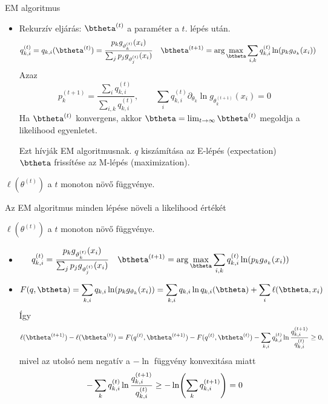 \documentclass[aspectratio=169,notheorems,9pt,\option]{beamer}
\begin{document}
\begin{frame}{EM algoritmus}
  \begin{itemize}
    \item Rekurzív eljárás: $\btheta^{(t)}$ a paraméter a $t$. lépés után.
    \begin{align*}
      q_{k,i}^{(t)}=q_{k,i}(\btheta^{(t)}) &= \frac{p_k g_{\theta^{(t)}_k}(x_i)}{\sum_j p_j g_{\theta^{(t)}_j}(x_i)} &
      \btheta^{(t+1)} &=\arg\max_{\btheta} \sum_{i,k} q_{k,i}^{(t)} \ln (p_k g_{\theta_k}(x_i))
    \end{align*}    
    Azaz
    \begin{displaymath}
       p^{(t+1)}_k = \frac{\sum_{i} q_{k,i}^{(t)}}{\sum_{i,k} q_{k,i}^{(t)}} ,
      \qquad  
      \sum_{i} q_{k,i}^{(t)} \partial_{\theta_k}\ln g_{\theta^{(t+1)}_k}(x_i)=0 
    \end{displaymath}
    Ha $\btheta^{(t)}$ konvergens, akkor $\btheta=\lim_{t\to\infty}\btheta^{(t)}$ megoldja a likelihood egyenletet.

    Ezt hívják EM algoritmusnak. $q$ kiszámítása az E-lépés (expectation) 
    $\btheta$ frissítése az M-lépés (maximization).
  \end{itemize}

  \begin{proposition}
    $\ell(\theta^{(t)})$ a  $t$ monoton növő függvénye. 
  \end{proposition}
\end{frame}


\begin{frame}{Az EM algoritmus minden lépése növeli  a likelihood értékét} 
  \begin{proposition}
    $\ell(\theta^{(t)})$ a  $t$ monoton növő függvénye. 
  \end{proposition}
  \begin{itemize}
    \item 
    \begin{align*}
      q_{k,i}^{(t)} &= \frac{p_k g_{\theta^{(t)}_k}(x_i)}{\sum_j p_j g_{\theta^{(t)}_j}(x_i)} &
      \btheta^{(t+1)} &=\arg\max_{\btheta} \sum_{i,k} q_{k,i}^{(t)} \ln (p_k g_{\theta_k}(x_i))
    \end{align*} 
    \item 
    \begin{displaymath}
      F(q,\btheta) = \sum_{k,i} q_{k,i} \ln (p_k g_{\theta_k}(x_i))= \sum_{k,i} q_{k,i}\ln q_{k,i}(\btheta)+\sum_i \ell(\btheta,x_i)
    \end{displaymath}
    Így 
    \begin{displaymath}
      \ell(\btheta^{(t+1)})-\ell(\btheta^{(t)}) = 
      F(q^{(t)},\btheta^{(t+1)})-F(q^{(t)},\btheta^{(t)}) - \sum_{k,i} q^{(t)}_{k,i}\ln\frac{q^{(t+1)}_{k,i}}{q^{(t)}_{k,i}}\geq 0,
    \end{displaymath}
    mivel az utolsó nem negatív a $-\ln$ függvény konvexitása miatt
    \begin{displaymath} 
      -\sum_{k} q^{(t)}_{k,i}\ln\frac{q^{(t+1)}_{k,i}}{q^{(t)}_{k,i}}\geq -\ln\zjel*{\sum_k q^{(t+1)}_{k,i}}=0 
    \end{displaymath}
  \end{itemize}
\end{frame}
\end{document}
